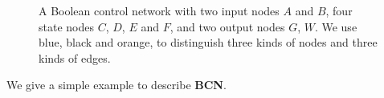 \documentclass[letterpaper, 10 pt, conference]{ieeeconf}  %
\begin{document}
 
 \begin{figure}[thpb]
      \centering
      
      \caption{A Boolean control network with two input nodes $A$ and $B$, four state nodes $C$, $D$, $E$ and $F$, and two output nodes $G$, $W$. We use blue, black and orange, to distinguish three kinds of nodes and three kinds of edges.}
      \label{fig:1}
  \end{figure}

We give a simple example to describe {\bf BCN}.
\end{document}
